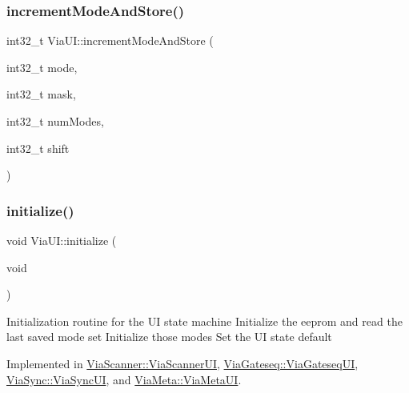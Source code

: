 \mbox{\label{class_via_u_i_a301e1692cc55b1ee55ba0133b5308f87}} 
\subsubsection{\texorpdfstring{increment\+Mode\+And\+Store()}{incrementModeAndStore()}}
{\footnotesize\ttfamily int32\+\_\+t Via\+U\+I\+::increment\+Mode\+And\+Store (\begin{DoxyParamCaption}\item[{int32\+\_\+t}]{mode,  }\item[{int32\+\_\+t}]{mask,  }\item[{int32\+\_\+t}]{num\+Modes,  }\item[{int32\+\_\+t}]{shift }\end{DoxyParamCaption})}

\mbox{\label{class_via_u_i_a573ba7aef8f4982ec4900258c770bdbb}} 
\subsubsection{\texorpdfstring{initialize()}{initialize()}}
{\footnotesize\ttfamily void Via\+U\+I\+::initialize (\begin{DoxyParamCaption}\item[{void}]{ }\end{DoxyParamCaption})\hspace{0.3cm}{\ttfamily [pure virtual]}}

Initialization routine for the UI state machine Initialize the eeprom and read the last saved mode set Initialize those modes Set the UI state default 

Implemented in \mbox{\hyperlink{class_via_scanner_1_1_via_scanner_u_i_ab12af2665a9e58574cd0cb4b8a003e0b}{Via\+Scanner\+::\+Via\+Scanner\+UI}}, \mbox{\hyperlink{class_via_gateseq_1_1_via_gateseq_u_i_ae59b0d739f92892cf9a0d16cd3d25bfa}{Via\+Gateseq\+::\+Via\+Gateseq\+UI}}, \mbox{\hyperlink{class_via_sync_1_1_via_sync_u_i_a0d9dbe5a0b663acc88b45b46f440db78}{Via\+Sync\+::\+Via\+Sync\+UI}}, and \mbox{\hyperlink{class_via_meta_1_1_via_meta_u_i_ac2bc1bfeb6ef0045d234bd5b89f9ec99}{Via\+Meta\+::\+Via\+Meta\+UI}}.

